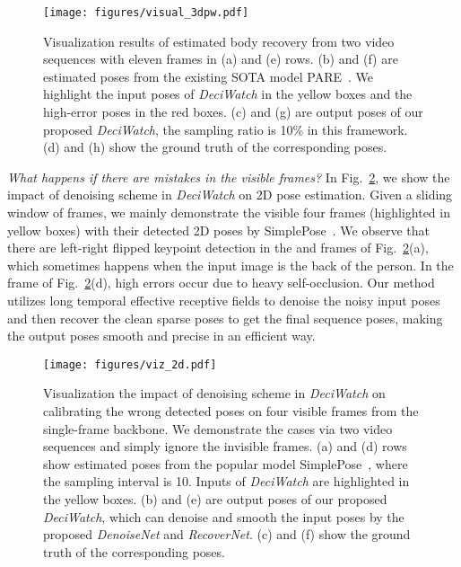 \documentclass[runningheads]{llncs}
\newcommand{\name}{\emph{DeciWatch}\xspace}
\begin{document}
\begin{figure}[h]	
\centering
 	
 		\begin{minipage}[t]{0.98\linewidth}
 			\centering         
 			\texttt{[image: figures/visual\_3dpw.pdf]}   
 		\end{minipage}
     	
    	
\caption{Visualization results of estimated body recovery from two video sequences with eleven frames in (a) and (e) rows. (b) and (f) are estimated poses from the existing SOTA model PARE~\cite{kocabas2021pare}. We highlight the input poses of \name in the yellow boxes and the high-error poses in the red boxes. (c) and (g) are output poses of our proposed \name, the sampling ratio is 10\% in this framework. (d) and (h) show the ground truth of the corresponding poses. }
\label{fig:supp_viz_1} 
\end{figure} 




\emph{What happens if there are mistakes in the visible frames?} In Fig.~\ref{fig:supp_viz2}, we show the impact of denoising scheme in \name on 2D pose estimation. Given a sliding window of  frames, we mainly demonstrate the visible four frames (highlighted in yellow boxes) with their detected 2D poses by SimplePose~\cite{xiao2018simple}. We observe that there are left-right flipped keypoint detection in the  and  frames of Fig.~\ref{fig:supp_viz2}(a), which sometimes happens when the input image is the back of the person. In the  frame of Fig.~\ref{fig:supp_viz2}(d), high errors occur due to heavy self-occlusion. Our method utilizes long temporal effective receptive fields to denoise the noisy input poses and then recover the clean sparse poses to get the final sequence poses, making the output poses smooth and precise in an efficient way.


\begin{figure}[h]	
\centering
 	
 		\begin{minipage}[t]{0.98\linewidth}
 			\centering         
 			\texttt{[image: figures/viz\_2d.pdf]}   
 		\end{minipage}     	
    	
\caption{Visualization the impact of denoising scheme in \name on calibrating the wrong detected poses on four visible frames from the single-frame backbone. We demonstrate the cases via two video sequences and simply ignore the invisible frames. (a) and (d) rows show estimated poses from the popular model SimplePose~\cite{xiao2018simple}, where the sampling interval is 10. Inputs of \name are highlighted in the yellow boxes. (b) and (e) are  output poses of our proposed \name, which can denoise and smooth the input poses by the proposed \emph{DenoiseNet} and \emph{RecoverNet}. (c) and (f) show the ground truth of the corresponding poses. }
\label{fig:supp_viz2} 
\end{figure} 
\end{document}

